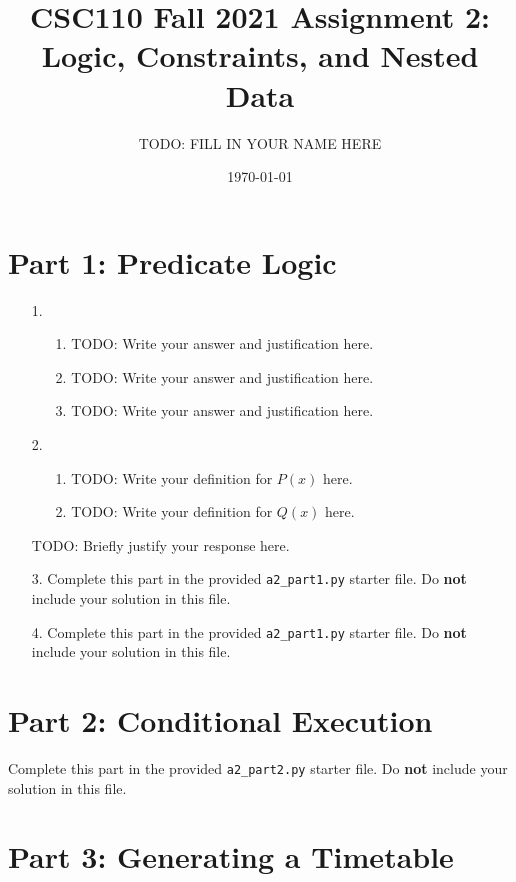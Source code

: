 \documentclass[fontsize=11pt]{article}
\title{CSC110 Fall 2021 Assignment 2: Logic, Constraints, and Nested Data}
\author{TODO: FILL IN YOUR NAME HERE}
\date{\today}
\begin{document}
\maketitle

\section*{Part 1: Predicate Logic}

\begin{enumerate}

\item[1.]
    \begin{enumerate}
        \item[1.] TODO: Write your answer and justification here.
        \item[2.] TODO: Write your answer and justification here.
        \item[3.] TODO: Write your answer and justification here.
    \end{enumerate}

\item[2.]
    \begin{enumerate}
        \item[1.] TODO: Write your definition for $P(x)$ here.
        \item[2.] TODO: Write your definition for $Q(x)$ here.
    \end{enumerate}
   TODO: Briefly justify your response here.

\item[3.]
Complete this part in the provided \texttt{a2\_part1.py} starter file.
Do \textbf{not} include your solution in this file.

\item[4.]
Complete this part in the provided \texttt{a2\_part1.py} starter file.
Do \textbf{not} include your solution in this file.

\end{enumerate}

\section*{Part 2: Conditional Execution}

Complete this part in the provided \texttt{a2\_part2.py} starter file.
Do \textbf{not} include your solution in this file.

\newpage

\section*{Part 3: Generating a Timetable}
\end{document}

